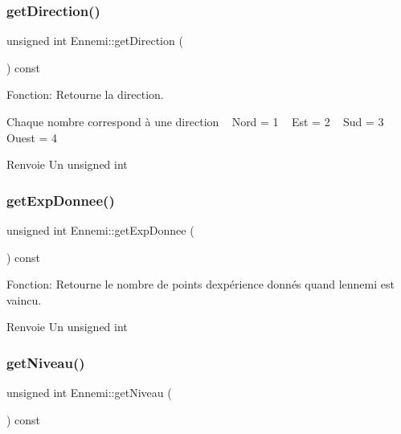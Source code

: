 \subsubsection{\texorpdfstring{get\+Direction()}{getDirection()}}
{\footnotesize\ttfamily unsigned int Ennemi\+::get\+Direction (\begin{DoxyParamCaption}{ }\end{DoxyParamCaption}) const}



Fonction\+: Retourne la direction. 

Chaque nombre correspond à une direction ~\newline
 Nord = 1 ~\newline
 Est = 2 ~\newline
 Sud = 3 ~\newline
 Ouest = 4 ~\newline
 \begin{DoxyReturn}{Renvoie}
Un unsigned int 
\end{DoxyReturn}
\mbox{\label{classEnnemi_a3122b2cdbe87622758a576ca17ee15be}} 
\subsubsection{\texorpdfstring{get\+Exp\+Donnee()}{getExpDonnee()}}
{\footnotesize\ttfamily unsigned int Ennemi\+::get\+Exp\+Donnee (\begin{DoxyParamCaption}{ }\end{DoxyParamCaption}) const}



Fonction\+: Retourne le nombre de points d\textquotesingle{}expérience donnés quand l\textquotesingle{}ennemi est vaincu. 

\begin{DoxyReturn}{Renvoie}
Un unsigned int 
\end{DoxyReturn}
\mbox{\label{classEnnemi_a84cb0911005eb3a3775e64b04a744e87}} 
\subsubsection{\texorpdfstring{get\+Niveau()}{getNiveau()}}
{\footnotesize\ttfamily unsigned int Ennemi\+::get\+Niveau (\begin{DoxyParamCaption}{ }\end{DoxyParamCaption}) const}



